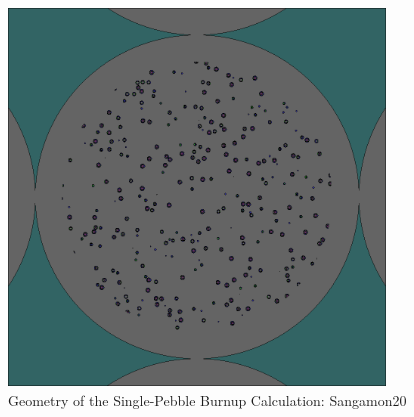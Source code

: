 \begin{figure}[h!]
\centering
\includegraphics[width = 10cm]{figures/burn-20.png}
\caption{Geometry of the Single-Pebble Burnup Calculation: Sangamon20}
\label{fig:burn-20}
\end{figure}